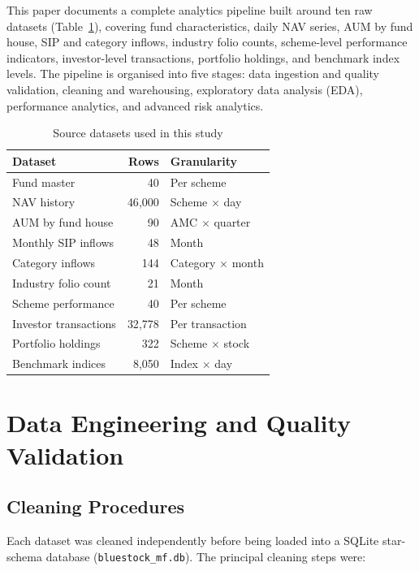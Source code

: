 \documentclass[10pt,twocolumn]{article}
\begin{document}
This paper documents a complete analytics pipeline built around ten raw
datasets (Table~\ref{tab:datasets}), covering fund characteristics, daily
NAV series, AUM by fund house, SIP and category inflows, industry folio
counts, scheme-level performance indicators, investor-level transactions,
portfolio holdings, and benchmark index levels. The pipeline is organised
into five stages: data ingestion and quality validation, cleaning and
warehousing, exploratory data analysis (EDA), performance analytics, and
advanced risk analytics.

\begin{table}[h]
\centering
\small
\caption{Source datasets used in this study}
\label{tab:datasets}
\begin{tabular}{@{}lrl@{}}
\toprule
\textbf{Dataset} & \textbf{Rows} & \textbf{Granularity} \\
\midrule
Fund master            & 40     & Per scheme \\
NAV history             & 46{,}000 & Scheme $\times$ day \\
AUM by fund house        & 90     & AMC $\times$ quarter \\
Monthly SIP inflows      & 48     & Month \\
Category inflows         & 144    & Category $\times$ month \\
Industry folio count     & 21     & Month \\
Scheme performance       & 40     & Per scheme \\
Investor transactions    & 32{,}778 & Per transaction \\
Portfolio holdings       & 322    & Scheme $\times$ stock \\
Benchmark indices        & 8{,}050 & Index $\times$ day \\
\bottomrule
\end{tabular}
\end{table}

\section{Data Engineering and Quality Validation}

\subsection{Cleaning Procedures}
Each dataset was cleaned independently before being loaded into a SQLite
star-schema database (\texttt{bluestock\_mf.db}). The principal cleaning
steps were:
\end{document}

